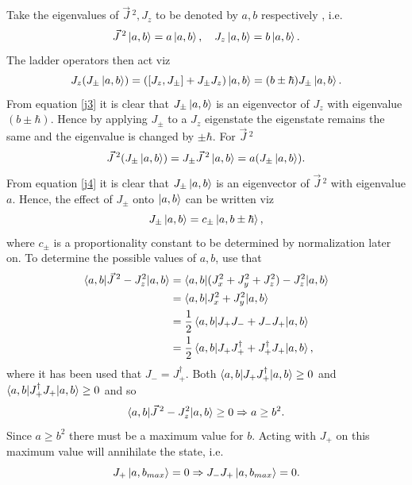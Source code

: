Take the eigenvalues of $\vec{J}\,^2, J_z$ to be denoted by $a,b$ respectively , i.e.
\begin{equation}
	\vec{J}\,^2\ket{a,b}=a\ket{a,b}, \quad J_z\ket{a,b}=b\ket{a,b}.
\end{equation} 
The ladder operators then act viz
\begin{equation}
	J_z(J_\pm\ket{a,b})=([J_z,J_\pm]+J_\pm J_z)\ket{a,b}=(b\pm \hbar)J_\pm\ket{a,b}.
	\label{j3}
\end{equation} 
From equation \eqref{j3} it is clear that $J_\pm\ket{a,b}$ is an eigenvector of $J_z$ with eigenvalue $(b\pm \hbar)$. Hence by applying $J_\pm$ to a $J_z$ eigenstate the eigenstate remains the same and the eigenvalue is changed by $\pm \hbar$. For $\vec{J}\,^2$
\begin{equation}
	\vec{J}\,^2(J_\pm\ket{a,b})=J_\pm\vec{J}\,^2\ket{a,b}=a(J_\pm\ket{a,b}).
	\label{j4}
\end{equation}  
From equation \eqref{j4} it is clear that $J_\pm\ket{a,b}$ is an eigenvector of $\vec{J}\,^2$ with eigenvalue $a$. Hence, the effect of $J_\pm$ onto $\ket{a,b}$ can be written viz
\begin{equation}
	J_\pm\ket{a,b}=c_\pm\ket{a,b\pm\hbar},
\end{equation} 
where $c_\pm$ is a proportionality constant to be determined by normalization later on. To determine the possible values of $a,b$, use that
\begin{equation}
	\begin{split}
		\braket{a,b|\vec{J}\,^2-J_z^2|a,b}&=\braket{a,b|(J_x^2+J_y^2+J_z^2)-J_z^2|a,b}\\
		&=\braket{a,b|J_x^2+J_y^2|a,b}\\
		&=\frac{1}{2}\braket{a,b|J_+J_-+J_-J_+|a,b}\\
		&=\frac{1}{2}\braket{a,b|J_+J_+^\dagger+J_+^\dagger J_+|a,b},\\
	\end{split}
\end{equation} 
where it has been used that $J_-=J_+^\dagger$. Both $\braket{a,b|J_+J_+^\dagger|a,b}\geq 0$ and $\braket{a,b|J_+^\dagger J_+|a,b}\geq 0$ and so
\begin{equation}
	\braket{a,b|\vec{J}\,^2-J_z^2|a,b}\geq 0 \Rightarrow a\geq b^2.
\end{equation} 
Since $a\geq b^2$ there must be a maximum value for $b$. Acting with $J_+$ on this maximum value will annihilate the state, i.e.
\begin{equation}
	J_+\ket{a,b_{max}}=0\Rightarrow J_-J_+\ket{a,b_{max}}=0.
	\label{j5}
\end{equation} 

